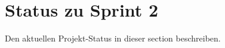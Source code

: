\section{Status zu Sprint 2
}\label{sec:status}

Den aktuellen Projekt-Status in  dieser section beschreiben.

